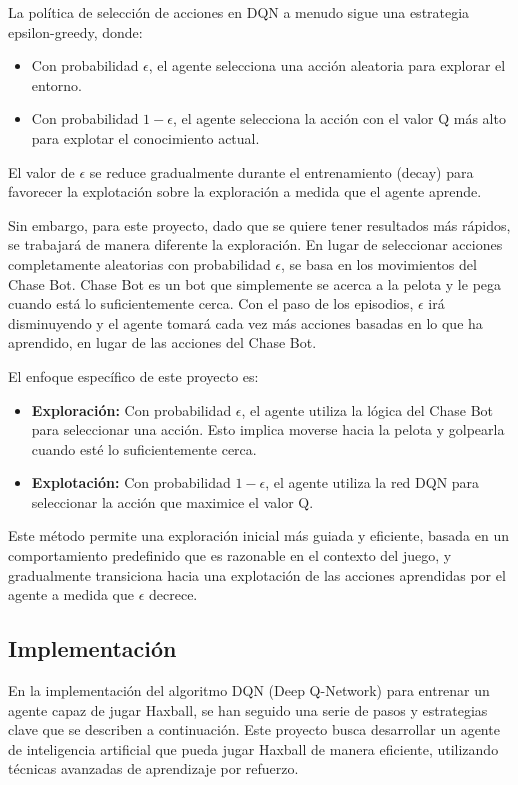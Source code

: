 \documentclass[10pt]{article}
\begin{document}
La política de selección de acciones en DQN a menudo sigue una estrategia epsilon-greedy, donde:
\begin{itemize}
	\item Con probabilidad \(\epsilon\), el agente selecciona una acción aleatoria para explorar el entorno.
	\item Con probabilidad \(1 - \epsilon\), el agente selecciona la acción con el valor Q más alto para explotar el conocimiento actual.
\end{itemize}

El valor de \(\epsilon\) se reduce gradualmente durante el entrenamiento (decay) para favorecer la explotación sobre la exploración a medida que el agente aprende.

Sin embargo, para este proyecto, dado que se quiere tener resultados más rápidos, se trabajará de manera diferente la exploración. En lugar de seleccionar acciones completamente aleatorias con probabilidad \(\epsilon\), se basa en los movimientos del Chase Bot. Chase Bot es un bot que simplemente se acerca a la pelota y le pega cuando está lo suficientemente cerca. Con el paso de los episodios, \(\epsilon\) irá disminuyendo y el agente tomará cada vez más acciones basadas en lo que ha aprendido, en lugar de las acciones del Chase Bot.

El enfoque específico de este proyecto es:

\begin{itemize}
	\item \textbf{Exploración:} Con probabilidad \(\epsilon\), el agente utiliza la lógica del Chase Bot para seleccionar una acción. Esto implica moverse hacia la pelota y golpearla cuando esté lo suficientemente cerca.
	\item \textbf{Explotación:} Con probabilidad \(1 - \epsilon\), el agente utiliza la red DQN para seleccionar la acción que maximice el valor Q.
\end{itemize}

Este método permite una exploración inicial más guiada y eficiente, basada en un comportamiento predefinido que es razonable en el contexto del juego, y gradualmente transiciona hacia una explotación de las acciones aprendidas por el agente a medida que \(\epsilon\) decrece.

\subsection{Implementación}

En la implementación del algoritmo DQN (Deep Q-Network) para entrenar un agente capaz de jugar Haxball, se han seguido una serie de pasos y estrategias clave que se describen a continuación. Este proyecto busca desarrollar un agente de inteligencia artificial que pueda jugar Haxball de manera eficiente, utilizando técnicas avanzadas de aprendizaje por refuerzo.
\end{document}
